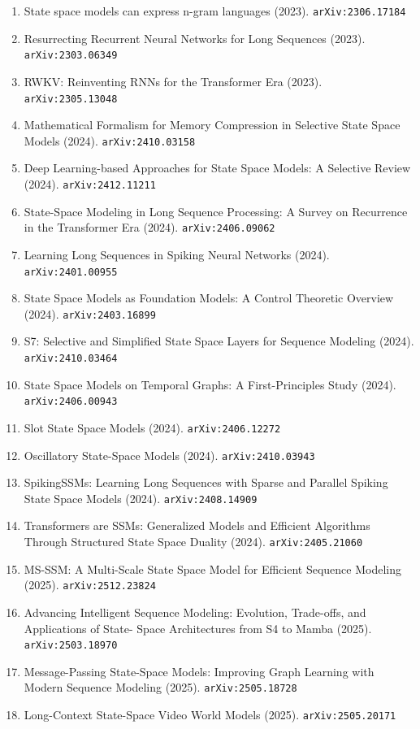 \documentclass[11pt]{article}
\begin{document}
\begin{enumerate}
  \item State space models can express n-gram languages (2023). \texttt{arXiv:2306.17184}
  \item Resurrecting Recurrent Neural Networks for Long Sequences (2023). \texttt{arXiv:2303.06349}
  \item RWKV: Reinventing RNNs for the Transformer Era (2023). \texttt{arXiv:2305.13048}
  \item Mathematical Formalism for Memory Compression in Selective State Space
  Models (2024). \texttt{arXiv:2410.03158}
  \item Deep Learning-based Approaches for State Space Models: A Selective
  Review (2024). \texttt{arXiv:2412.11211}
  \item State-Space Modeling in Long Sequence Processing: A Survey on Recurrence in the Transformer Era (2024). \texttt{arXiv:2406.09062}
  \item Learning Long Sequences in Spiking Neural Networks (2024). \texttt{arXiv:2401.00955}
  \item State Space Models as Foundation Models: A Control Theoretic Overview (2024). \texttt{arXiv:2403.16899}
  \item S7: Selective and Simplified State Space Layers for Sequence Modeling (2024). \texttt{arXiv:2410.03464}
  \item State Space Models on Temporal Graphs: A First-Principles Study (2024). \texttt{arXiv:2406.00943}
  \item Slot State Space Models (2024). \texttt{arXiv:2406.12272}
  \item Oscillatory State-Space Models (2024). \texttt{arXiv:2410.03943}
  \item SpikingSSMs: Learning Long Sequences with Sparse and Parallel Spiking
  State Space Models (2024). \texttt{arXiv:2408.14909}
  \item Transformers are SSMs: Generalized Models and Efficient Algorithms
  Through Structured State Space Duality (2024). \texttt{arXiv:2405.21060}
  \item MS-SSM: A Multi-Scale State Space Model for Efficient Sequence Modeling (2025). \texttt{arXiv:2512.23824}
  \item Advancing Intelligent Sequence Modeling: Evolution, Trade-offs, and Applications of State- Space Architectures from S4 to Mamba (2025). \texttt{arXiv:2503.18970}
  \item Message-Passing State-Space Models: Improving Graph Learning with Modern Sequence Modeling (2025). \texttt{arXiv:2505.18728}
  \item Long-Context State-Space Video World Models (2025). \texttt{arXiv:2505.20171}

\end{enumerate}
\end{document}
